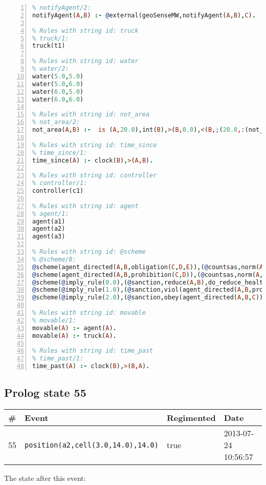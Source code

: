 \documentclass[11pt]{article}\usepackage[utf8]{inputenc}\usepackage{geometry}
\begin{document}
\begin{lstlisting}[language=Prolog, numbers=left]
% Rules with string id: notifyAgent
% notifyAgent/2:
notifyAgent(A,B) :- @external(geoSenseMW,notifyAgent(A,B),C).

% Rules with string id: truck
% truck/1:
truck(t1)

% Rules with string id: water
% water/2:
water(5.0,5.0)
water(5.0,6.0)
water(6.0,5.0)
water(6.0,6.0)

% Rules with string id: not_area
% not_area/2:
not_area(A,B) :-  is (A,20.0),int(B),>(B,0.0),<(B,;(20.0,:(not_area(A,B), is (-(B),20.0)))),int(A),>(A,0.0),<(A,;(20.0,:(area(A,B),-(int(A))))),int(B),>(A,0.0),>(B,0.0),<(A,21.0),<(B,21.0).

% Rules with string id: time_since
% time_since/1:
time_since(A) :- clock(B),>(A,B).

% Rules with string id: controller
% controller/1:
controller(c1)

% Rules with string id: agent
% agent/1:
agent(a1)
agent(a2)
agent(a3)

% Rules with string id: @scheme
% @scheme/8:
@scheme(agent_directed(A,B,obligation(C,D,E)),(@countsas,norm(A,B,F,obligation(C,D,E)),F),false,(listTrue(C)),(time_past(D)),false,[plus(viol(agent_directed(A,B,obligation(C,D,E))))|[]],[plus(obey(agent_directed(A,B,obligation(C,D,E))))|[]])
@scheme(agent_directed(A,B,prohibition(C,D)),(@countsas,norm(A,B,E,prohibition(C,D)),E),(listTrue(C)),false,(false),false,[plus(viol(agent_directed(A,B,prohibition(C,D))))|[]],[plus(obey(agent_directed(A,B,prohibition(C,D))))|[]])
@scheme(@imply_rule(0.0),(@sanction,reduce(A,B),do_reduce_health(A,B),notifyAgent(A,changed(status))),true,false,false,false,[min(reduce(A,B))|[]],[])
@scheme(@imply_rule(1.0),(@sanction,viol(agent_directed(A,B,prohibition(C,D))),do_sanction(D)),true,false,false,false,[min(viol(agent_directed(A,B,prohibition(C,D))))|[]],[])
@scheme(@imply_rule(2.0),(@sanction,obey(agent_directed(A,B,C))),true,false,false,false,[min(obey(agent_directed(A,B,C)))|[]],[])

% Rules with string id: movable
% movable/1:
movable(A) :- agent(A).
movable(A) :- truck(A).

% Rules with string id: time_past
% time_past/1:
time_past(A) :- clock(B),>(B,A).

\end{lstlisting}
\clearpage 
\subsection{Prolog state 55}
\begin{table}[ht]
\centering 
\begin{tabular}{l l l l} 
\textbf{\#} & \textbf{Event} & \textbf{Regimented} & \textbf{Date} \\ [0.5ex] 
\hline
55&\texttt{position(a2,cell(3.0,14.0),14.0)}&true&2013-07-24 10:56:57\\ [1ex] \hline\end{tabular}
\end{table}
The state after this event:
\end{document}
